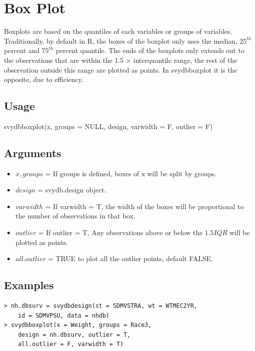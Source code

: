 \newpage
\section{Box Plot} \label{c3.2}

Boxplots are based on the quantiles of each variables or groups of variables. Traditionally, by default in {\sf R}, the boxes of the boxplot only uses the median, $25^{th}$ percent and $75^{th}$ percent quantile. The ends of the boxplots only extends out to the observations that are within the 1.5 $\times$ interquantile range, the rest of the observation outside this range are plotted as points. In {\ttfamily svydbboxplot} it is the opposite, due to efficiency.

\subsection{Usage} \label{c.3.1.1}
\begin{center}
    {\ttfamily svydbboxplot(x, groups = NULL, design, varwidth = F, outlier = F)}
\end{center}
\subsection{Arguments}
\begin{itemize}
\item $x, groups$ = If {\ttfamily groups} is defined, boxes of x will be split by {\ttfamily groups}.

\item $design$ = svydb.design object.

\item $varwidth$ = If {\ttfamily varwidth = T}, the width of the boxes will be proportional to the number of observations in that box.

\item $outlier$ = If {\ttfamily outlier = T}, Any observations above or below the $1.5IQR$ will be plotted as points.

\item $all.outlier$ = {\ttfamily TRUE} to plot all the outlier points, default {\ttfamily FALSE}.
\end{itemize}

\subsection{Examples} \label{c.3.1.2}
\begin{lstlisting}
> nh.dbsurv = svydbdesign(st = SDMVSTRA, wt = WTMEC2YR, 
    id = SDMVPSU, data = nhdb)
> svydbboxplot(x = Weight, groups = Race3, 
    design = nh.dbsurv, outlier = T, 
    all.outlier = F, varwidth = T)
\end{lstlisting}

